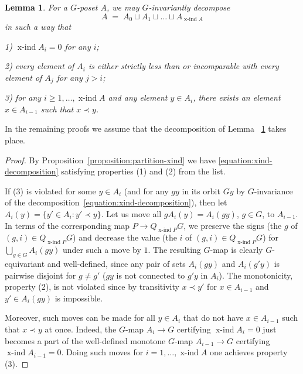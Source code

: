 \documentclass[preprint,12pt]{article}
\renewcommand{\ge}{\geqslant}
\newtheorem{lemma}[theorem]{Lemma}
\theoremstyle{definition}
\theoremstyle{remark}
\numberwithin{equation}{section}
\DeclareMathOperator{\xind}{x-ind}
\begin{document}
\begin{lemma}
\label{lemma:move-down}
For a $G$-poset $A$, we may $G$-invariantly decompose
\begin{equation}
\label{equation:xind-decomposition}
A \;=\; A_0 \sqcup A_1 \sqcup \dots \sqcup A_{\xind A}
\end{equation}
in such a way that 

1) $\xind A_i = 0$ for any $i$;

2) every element of $A_i$ is either strictly less than or incomparable with every element of $A_j$ for any $j>i$;

3) for any $i \ge 1,\ldots,\xind A$ and any element $y \in A_i$, there exists an element $x \in A_{i-1}$ such that $x\prec y$.
\end{lemma}

In the remaining proofs we assume that the decomposition of Lemma~
\ref{lemma:move-down} takes place.

\begin{proof}
By Proposition~\ref{proposition:partition-xind} we have \eqref{equation:xind-decomposition} satisfying properties (1) and (2) from the list.  

If (3) is violated for some $y \in A_i$ (and for any $gy$ in its orbit $Gy$ by $G$-invariance of the decomposition~\eqref{equation:xind-decomposition}), then let $A_i(y) = \{y'\in A_i : y'\prec y\}$. Let us move all $gA_i(y)=A_i(gy)$, $g\in G$, to $A_{i-1}$. In terms of the corresponding map $P\to Q_{\xind P} G$, we preserve the signs (the $g$ of $(g, i)\in Q_{\xind P}G$) and decrease the value (the $i$ of $(g, i)\in Q_{\xind P}G$) for $\bigcup_{g\in G} A_i(gy)$ under such a move by $1$. The resulting $G$-map is clearly $G$-equivariant and well-defined, since any pair of sets $A_i(gy)$ and $A_i(g'y)$ is pairwise disjoint for $g\neq g'$ ($gy$ is not connected to $g'y$ in $A_i$). The monotonicity, property (2), is not violated since by transitivity $x\prec y'$ for $x\in A_{i-1}$ and $y'\in A_i(gy)$ is impossible. 

Moreover, such moves can be made for all $y\in A_i$ that do not have $x\in A_{i-1}$ such that $x\prec y$ at once. Indeed, the $G$-map $A_i\to G$ certifying $\xind A_i=0$ just becomes a part of the well-defined monotone $G$-map $A_{i-1}\to G$ certifying $\xind A_{i-1}=0$. Doing such moves for $i=1,\ldots,\xind A$ one achieves property (3).
\end{proof}
\end{document}
